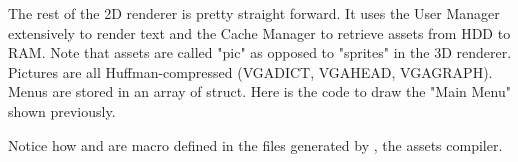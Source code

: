 \par
The rest of the 2D renderer is pretty straight forward. It uses the User Manager extensively to render text and the Cache Manager to retrieve assets from HDD to RAM. Note that assets are called "pic" as opposed to "sprites" in the 3D renderer. Pictures are all Huffman-compressed (VGADICT, VGAHEAD, VGAGRAPH). Menus are stored in an array of struct. Here is the code to draw the "Main Menu" shown previously.\\

\par
\begin{minipage}{\textwidth}

\end{minipage}

\par
\begin{minipage}{\textwidth}

\end{minipage}
\par
Notice how  and  are macro defined in the files generated by , the assets compiler.

